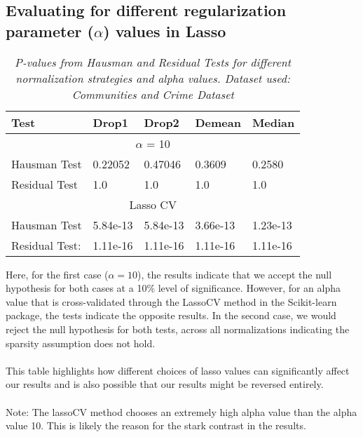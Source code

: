 \subsection{Evaluating for different regularization parameter ($\alpha$) values in Lasso}
\begin{table}[h!]
\renewcommand{\arraystretch}{1.5}
\centering
\begin{tabular}{||l l l l l||} 
 \hline
 \hline
 Test & Drop1 & Drop2 &  Demean & Median \\ [0.5ex] 
 \hline \hline
 \multicolumn{5}{||c||}{$\alpha$ = 10} \\ [0.5ex]
 Hausman Test & 0.22052 & 0.47046 & 0.3609 & 0.2580 \\ 
 Residual Test & 1.0 & 1.0 & 1.0 & 1.0 \\
 \hline
 \multicolumn{5}{||c||}{Lasso CV} \\ [0.5ex]
 Hausman Test & 5.84e-13 & 5.84e-13 & 3.66e-13 & 1.23e-13 \\ 
 Residual Test: & 1.11e-16 & 1.11e-16  & 1.11e-16 & 1.11e-16 \\ [1ex] 
 \hline \hline
\end{tabular}
\caption{\textit{P-values from Hausman and Residual Tests for different normalization strategies and alpha values. Dataset used: Communities and Crime Dataset}}
\label{table:1}
\end{table}


Here, for the first case ($\alpha = 10$), the results indicate that we accept the null hypothesis for both cases at a 10\% level of significance. However, for an alpha value that is cross-validated through the LassoCV method in the Scikit-learn package, the tests indicate the opposite results. In the second case, we would reject the null hypothesis for both tests, across all normalizations indicating the sparsity assumption does not hold.\\ 
\\
This table highlights how different choices of lasso values can significantly affect our results and is also possible that our results might be reversed entirely. \\
\\
Note: The lassoCV method chooses an extremely high alpha value than the alpha value 10. This is likely the reason for the stark contrast in the results. 